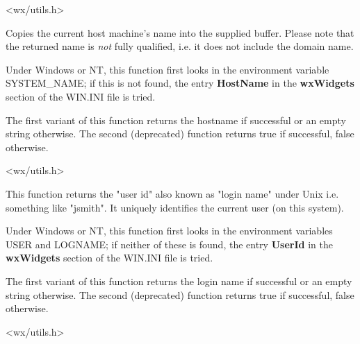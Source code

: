 
<wx/utils.h>


\label{wxgethostname}



Copies the current host machine's name into the supplied buffer. Please note
that the returned name is {\it not} fully qualified, i.e. it does not include
the domain name.

Under Windows or NT, this function first looks in the environment
variable SYSTEM\_NAME; if this is not found, the entry {\bf HostName}\rtfsp
in the {\bf wxWidgets} section of the WIN.INI file is tried.

The first variant of this function returns the hostname if successful or an
empty string otherwise. The second (deprecated) function returns true
if successful, false otherwise.




<wx/utils.h>


\label{wxgetuserid}



This function returns the "user id" also known as "login name" under Unix i.e.
something like "jsmith". It uniquely identifies the current user (on this system).

Under Windows or NT, this function first looks in the environment
variables USER and LOGNAME; if neither of these is found, the entry {\bf UserId}\rtfsp
in the {\bf wxWidgets} section of the WIN.INI file is tried.

The first variant of this function returns the login name if successful or an
empty string otherwise. The second (deprecated) function returns true
if successful, false otherwise.




<wx/utils.h>


\label{wxgetosdescription}

